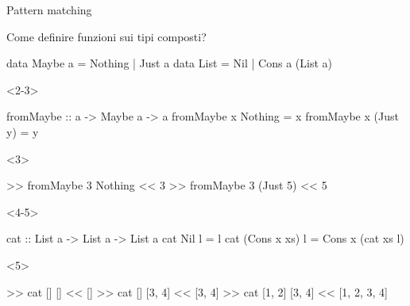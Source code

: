\begin{frame}[fragile]{\secname}{Pattern matching}
\begin{overlayarea}{\textwidth}{0.7\textheight}
Come definire funzioni sui tipi composti?

\begin{haskellcode}
data Maybe a = Nothing | Just a
data List = Nil | Cons a (List a)
\end{haskellcode}

\begin{onlyenv}<2-3>
\begin{haskellcode}
fromMaybe :: a -> Maybe a -> a
fromMaybe x Nothing = x
fromMaybe x (Just y) = y
\end{haskellcode}
\end{onlyenv}

\begin{onlyenv}<3>
\begin{runhaskell}
>>  fromMaybe 3 Nothing
<<  3
>>  fromMaybe 3 (Just 5)
<<  5
\end{runhaskell}
\end{onlyenv}

\begin{onlyenv}<4-5>
\begin{haskellcode}
cat :: List a -> List a -> List a
cat Nil l = l
cat (Cons x xs) l = Cons x (cat xs l)
\end{haskellcode}
\end{onlyenv}

\begin{onlyenv}<5>
\begin{runhaskell}
>>  cat [] []
<<  []
>>  cat [] [3, 4]
<<  [3, 4]
>>  cat [1, 2] [3, 4]
<<  [1, 2, 3, 4]
\end{runhaskell}
\end{onlyenv}
\end{overlayarea}
\end{frame}